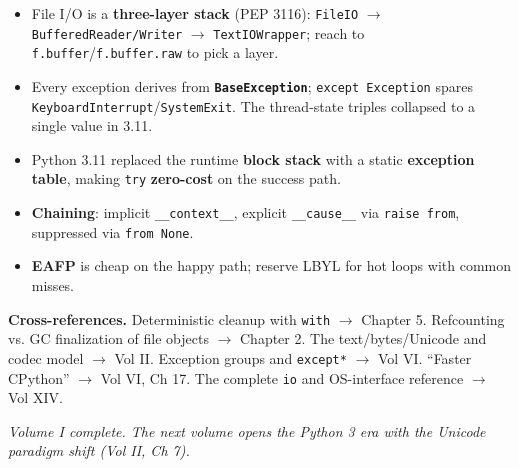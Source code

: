 \begin{itemize}
  \item File I/O is a \textbf{three-layer stack} (PEP 3116): \texttt{FileIO} $\rightarrow$
    \texttt{BufferedReader/Writer} $\rightarrow$ \texttt{TextIOWrapper}; reach to
    \texttt{f.buffer}/\texttt{f.buffer.raw} to pick a layer.
  \item Every exception derives from \textbf{\texttt{BaseException}}; \texttt{except Exception}
    spares \texttt{KeyboardInterrupt}/\texttt{SystemExit}. The thread-state triples collapsed to
    a single value in 3.11.
  \item Python 3.11 replaced the runtime \textbf{block stack} with a static \textbf{exception
    table}, making \texttt{try} \textbf{zero-cost} on the success path.
  \item \textbf{Chaining}: implicit \texttt{\_\_context\_\_}, explicit \texttt{\_\_cause\_\_} via
    \texttt{raise from}, suppressed via \texttt{from None}.
  \item \textbf{EAFP} is cheap on the happy path; reserve LBYL for hot loops with common misses.
\end{itemize}

\textbf{Cross-references.} Deterministic cleanup with \texttt{with} $\rightarrow$ Chapter 5.
Refcounting vs. GC finalization of file objects $\rightarrow$ Chapter 2. The text/bytes/Unicode
and codec model $\rightarrow$ Vol II. Exception groups and \texttt{except*} $\rightarrow$ Vol VI.
``Faster CPython'' $\rightarrow$ Vol VI, Ch 17. The complete \texttt{io} and OS-interface
reference $\rightarrow$ Vol XIV.

\bigskip
\noindent\emph{Volume I complete. The next volume opens the Python 3 era with the Unicode
paradigm shift (Vol II, Ch 7).}
